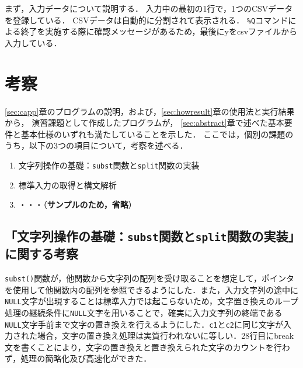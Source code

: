 まず，入力データについて説明する．
入力中の最初の1行で，1つのCSVデータを登録している．
CSVデータは自動的に分割されて表示される．
\verb|%Q|コマンドによる終了を実施する際に確認メッセージがあるため，最後にyをcsvファイルから入力している．





\section{考察}

\ref{sec:capp}章のプログラムの説明，および，\ref{sec:howresult}章の使用法と実行結果から，
演習課題として作成したプログラムが，
\ref{sec:abstract}章で述べた基本要件と基本仕様のいずれも満たしていることを示した．
ここでは，個別の課題のうち，以下の3つの項目について，考察を述べる．

\begin{enumerate}
\setlength{\parskip}{2pt} \setlength{\itemsep}{2pt}
    \item 文字列操作の基礎：\texttt{subst}関数と\texttt{split}関数の実装
    \item 標準入力の取得と構文解析
    \item ・・・（\textbf{サンプルのため，省略}）
\end{enumerate}

\subsection{「文字列操作の基礎：\texttt{subst}関数と\texttt{split}関数の実装」に関する考察}

\verb|subst()|関数が，他関数から文字列の配列を受け取ることを想定して，ポインタを使用して他関数内の配列を参照できるようにした．また，入力文字列の途中に\verb|NULL|文字が出現することは標準入力では起こらないため，文字置き換えのループ処理の継続条件に\verb|NULL|文字を用いることで，確実に入力文字列の終端である\verb|NULL|文字手前まで文字の置き換えを行えるようにした．\verb|c1|と\verb|c2|に同じ文字が入力された場合，文字の置き換え処理は実質行われないに等しい．28行目にbreak文を書くことにより，文字の置き換えと置き換えられた文字のカウントを行わず，処理の簡略化及び高速化ができた．


